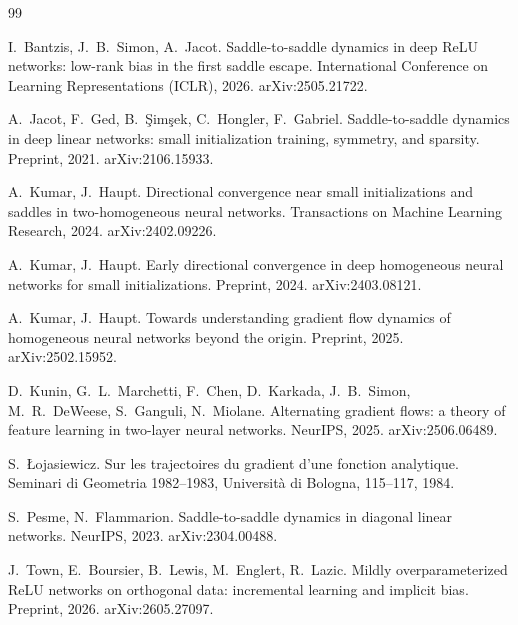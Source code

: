 \documentclass[11pt]{article}
\theoremstyle{definition}
\theoremstyle{remark}
\numberwithin{equation}{section}
\begin{document}
\begin{thebibliography}{99}\small

 I.~Bantzis, J.~B.~Simon, A.~Jacot. Saddle-to-saddle dynamics in deep ReLU networks: low-rank bias in the first saddle escape. International Conference on Learning Representations (ICLR), 2026. arXiv:2505.21722.

 A.~Jacot, F.~Ged, B.~\c{S}im\c{s}ek, C.~Hongler, F.~Gabriel. Saddle-to-saddle dynamics in deep linear networks: small initialization training, symmetry, and sparsity. Preprint, 2021. arXiv:2106.15933.

 A.~Kumar, J.~Haupt. Directional convergence near small initializations and saddles in two-homogeneous neural networks. Transactions on Machine Learning Research, 2024. arXiv:2402.09226.

 A.~Kumar, J.~Haupt. Early directional convergence in deep homogeneous neural networks for small initializations. Preprint, 2024. arXiv:2403.08121.

 A.~Kumar, J.~Haupt. Towards understanding gradient flow dynamics of homogeneous neural networks beyond the origin. Preprint, 2025. arXiv:2502.15952.

 D.~Kunin, G.~L.~Marchetti, F.~Chen, D.~Karkada, J.~B.~Simon, M.~R.~DeWeese, S.~Ganguli, N.~Miolane. Alternating gradient flows: a theory of feature learning in two-layer neural networks. NeurIPS, 2025. arXiv:2506.06489.

 S.~{\L}ojasiewicz. Sur les trajectoires du gradient d'une fonction analytique. Seminari di Geometria 1982--1983, Universit\`a di Bologna, 115--117, 1984.

 S.~Pesme, N.~Flammarion. Saddle-to-saddle dynamics in diagonal linear networks. NeurIPS, 2023. arXiv:2304.00488.

 J.~Town, E.~Boursier, B.~Lewis, M.~Englert, R.~Lazic. Mildly overparameterized ReLU networks on orthogonal data: incremental learning and implicit bias. Preprint, 2026. arXiv:2605.27097.

\end{thebibliography}
\end{document}
